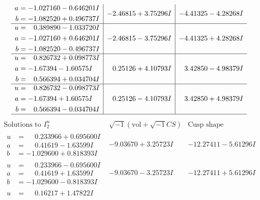 \documentclass[1p]{elsarticle_modified}
\theoremstyle{definition}
\newcommand{\I}{\sqrt{-1}}
\begin{document}
$$\begin{array}{c|c|c}
\begin{aligned}
a &= -1.027160 - 0.646201 I \\
b &= -1.082520 + 0.496737 I\end{aligned}
 & -2.46815 + 3.75296 I & -4.41325 - 4.28268 I \\ \hline\begin{aligned}
u &= \phantom{-}0.389890 - 1.033720 I \\
a &= -1.027160 + 0.646201 I \\
b &= -1.082520 - 0.496737 I\end{aligned}
 & -2.46815 - 3.75296 I & -4.41325 + 4.28268 I \\ \hline\begin{aligned}
u &= \phantom{-}0.826732 + 0.098773 I \\
a &= -1.67394 - 1.60575 I \\
b &= \phantom{-}0.566394 + 0.034704 I\end{aligned}
 & \phantom{-}0.25126 + 4.10793 I & \phantom{-}3.42850 - 4.98379 I \\ \hline\begin{aligned}
u &= \phantom{-}0.826732 - 0.098773 I \\
a &= -1.67394 + 1.60575 I \\
b &= \phantom{-}0.566394 - 0.034704 I\end{aligned}
 & \phantom{-}0.25126 - 4.10793 I & \phantom{-}3.42850 + 4.98379 I\\
 \hline 
 \end{array}$$\newpage$$\begin{array}{c|c|c}  
\text{Solutions to }I^u_{2}& \I (\text{vol} + \sqrt{-1}CS) & \text{Cusp shape}\\
 \hline 
\begin{aligned}
u &= \phantom{-}0.233966 + 0.695600 I \\
a &= \phantom{-}0.41619 - 1.63599 I \\
b &= -1.029600 + 0.818393 I\end{aligned}
 & -9.03670 + 3.25723 I & -12.27411 - 5.61296 I \\ \hline\begin{aligned}
u &= \phantom{-}0.233966 - 0.695600 I \\
a &= \phantom{-}0.41619 + 1.63599 I \\
b &= -1.029600 - 0.818393 I\end{aligned}
 & -9.03670 - 3.25723 I & -12.27411 + 5.61296 I \\ \hline\begin{aligned}
u &= \phantom{-}0.16217 + 1.47822 I \\

\end{aligned}
\end{array}$$
\end{document}
